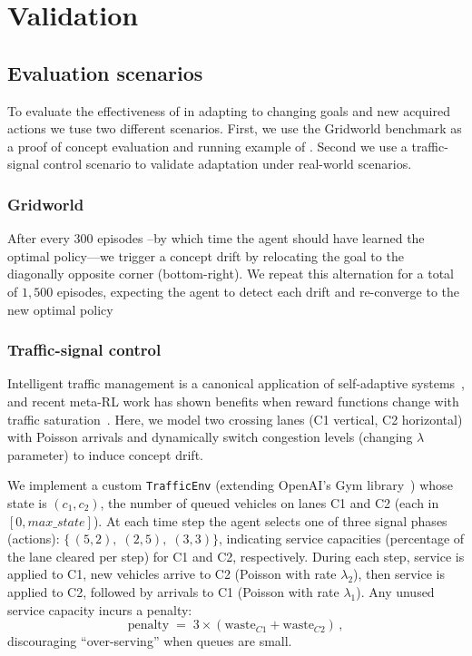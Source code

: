 
\section{Validation}
\label{sec:validation}

\subsection{Evaluation scenarios}
To evaluate the effectiveness of \adaptiverl in adapting to changing goals and new acquired actions we tuse two different scenarios. First, we use the Gridworld benchmark as a proof of concept evaluation and running example of \adaptiverl. Second we use a traffic-signal control scenario to validate adaptation under real-world scenarios.

\subsubsection{Gridworld}
After every 300 episodes --by 
which time the agent should have learned the optimal policy---we trigger a concept drift by relocating 
the goal to the diagonally opposite corner (bottom-right). We repeat this alternation for a total of $1,500$ 
episodes, expecting the agent to detect each drift and re-converge to the new optimal policy

\subsubsection{Traffic-signal control}
Intelligent traffic management is a canonical application of self-adaptive systems~\cite{HENRICHS2022106940}, and recent meta-\ac{RL} work has shown benefits when reward functions change with traffic saturation~\cite{meta-rl-traffic}. Here, we model two crossing lanes (C1 vertical, C2 horizontal) with Poisson arrivals and dynamically switch congestion levels (changing $\lambda$ parameter) to induce concept drift. 

We implement a custom \texttt{TrafficEnv} (extending OpenAI's Gym library~\cite{gymlib}) whose state is $(c_1,c_2)$, the number of queued vehicles on lanes C1 and C2 (each in $[0,\mathit{max\_state}]$). At each time step the agent selects one of three signal phases (actions): $\{\,(5,2),\;(2,5),\;(3,3)\}$, indicating service capacities (percentage of the lane cleared per step) for C1 and C2, respectively. During each step, service is applied to C1, new vehicles arrive to C2 (Poisson with rate $\lambda_{2}$), then service is applied to C2, followed by arrivals to C1 (Poisson with rate $\lambda_{1}$). Any unused service capacity incurs a penalty:
\[
\mathrm{penalty} \;=\; 3\times(\text{waste}_{C1} + \text{waste}_{C2})\,,
\]
discouraging “over-serving” when queues are small.

